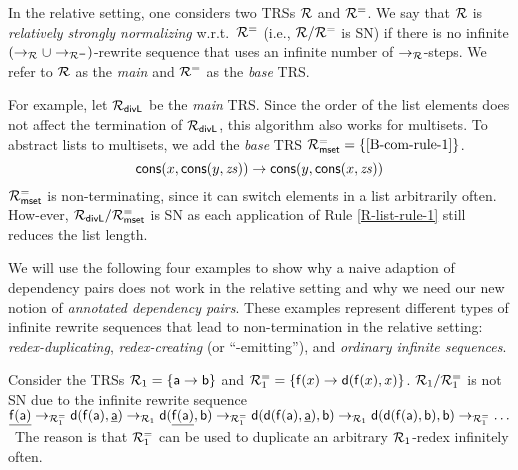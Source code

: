 In the relative setting, one considers two TRSs
$\mathcal{R}$ and $\mathcal{R}^{=}$.
We say that $\mathcal{R}$ is \emph{relatively strongly normalizing} w.r.t.\ $\mathcal{R}^{=}$ (i.e.,
$\mathcal{R} / \mathcal{R}^{=}$ is SN) if there is no infinite $(\to_{\mathcal{R}} \cup \to_{\mathcal{R}^{=}})$-rewrite sequence that uses an infinite number of $\to_{\mathcal{R}}$-steps.
We refer to $\mathcal{R}$ as the \emph{main} and $\mathcal{R}^{=}$ as the \emph{base} TRS.

\begin{example}\label{ex:mset1}
    For example, let $\mathcal{R}_{\mathsf{divL}}$ be the \emph{main} TRS.
    Since the order of the list elements does not affect \pagebreak[2] the termination
   of $\mathcal{R}_{\mathsf{divL}}$, 
     this algorithm also works for multisets.
   To abstract lists to multisets, we add the \emph{base} TRS $\mathcal{R}^{=}_{\mathsf{mset}} = \{\eqref{B-com-rule-1}\}$.
    \begin{equation}
        \label{B-com-rule-1} \mathsf{cons}(x, \mathsf{cons}(y,\mathit{zs})) \to \mathsf{cons}(y, \mathsf{cons}(x,\mathit{zs})) 
    \end{equation}
    $\mathcal{R}^{=}_{\mathsf{mset}}$ is non-terminating, since it can
    switch elements in a list arbitrarily often.
    How-\linebreak ever, $\mathcal{R}_{\mathsf{divL}} / \mathcal{R}^{=}_{\mathsf{mset}}$ is SN as each application of
    Rule \eqref{R-list-rule-1} still reduces the list length.
\end{example}

We will use the following four examples to show why a naive
adaption of dependency pairs does not work in the relative setting and why we need our new
notion of \emph{annotated dependency pairs}.
These examples represent different types of infinite rewrite sequences
that lead to non-termination in the relative setting: \emph{redex-duplicating},
\emph{redex-creating} (or ``-emitting''), and \emph{ordinary infinite sequences}.

\begin{example}\label{example:redex-duplicating}
    Consider the TRSs $\mathcal{R}_1 = \{\mathsf{a} \to \mathsf{b}\}$ and $\mathcal{R}_1^{=} = \{\mathsf{f}(x) \to \mathsf{d}(\mathsf{f}(x),x)\}$.
    $\mathcal{R}_1 / \mathcal{R}_1^{=}$ is not SN due to the infinite rewrite sequence $\underline{\tf(\ta)}
    \to_{\R_1^{=}}\linebreak \tc(\tf(\ta),\underline{\ta}) \to_{\R_1} \tc(\underline{\tf(\ta)},\tb) \to_{\R_1^{=}}
    \tc(\tc(\tf(\ta),\underline{\ta}),\tb)\to_{\R_1}
      \tc(\tc(\tf(\ta),\tb),\tb)\to_{\R_1^{=}}
    \ldots$\
    The reason is that $\mathcal{R}_1^{=}$ can be used to duplicate an arbitrary $\mathcal{R}_1$-redex infinitely often.
\end{example}

